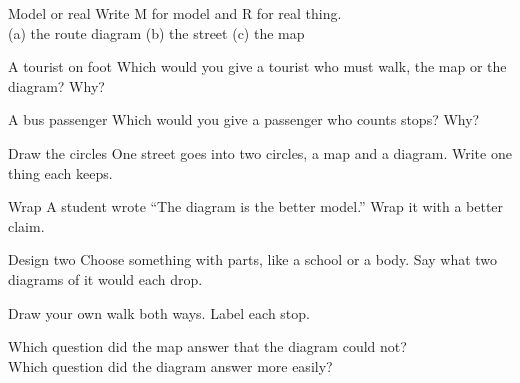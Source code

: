 \begin{puzzle}{Model or real}
Write M for model and R for real thing.\\
(a) the route diagram \wline[1cm] \quad (b) the street \wline[1cm] \quad (c) the map \wline[1cm]
\end{puzzle}

\clearpage

\begin{puzzle}{A tourist on foot}
Which would you give a tourist who must walk, the map or the diagram? \wline[2cm] Why? \wline[4cm]
\end{puzzle}

\begin{puzzle}{A bus passenger}
Which would you give a passenger who counts stops? \wline[2cm] Why? \wline[4cm]
\end{puzzle}

\begin{puzzle}{Draw the circles}
One street goes into two circles, a map and a diagram. Write one thing each keeps.
\begin{center}
\end{center}
\end{puzzle}

\begin{puzzle}{Wrap}
A student wrote ``The diagram is the better model.'' Wrap it with a better claim. \wline[6cm]
\end{puzzle}

\begin{puzzle}{Design two}
Choose something with parts, like a school or a body. Say what two diagrams of it would each drop. \wline[6cm]
\end{puzzle}
\clearpage

\thispagestyle{fancy}
Draw your own walk both ways. Label each stop.\par\medskip
{}\par\medskip
{}

\vspace{8pt}
Which question did the map answer that the diagram could not? \wline[3cm]\\[10pt]
Which question did the diagram answer more easily? \wline[3cm]
\clearpage

